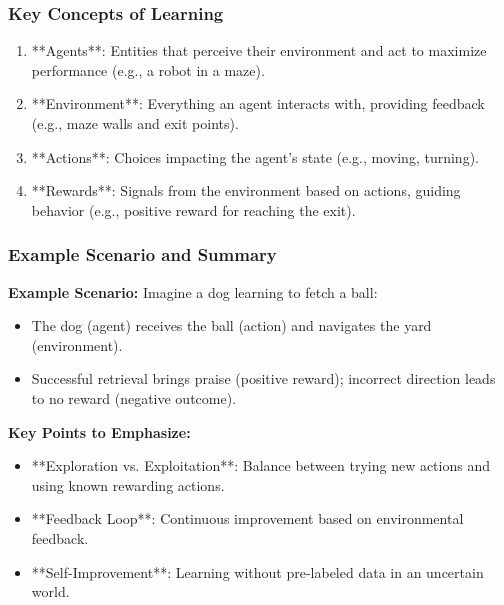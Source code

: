 \documentclass[aspectratio=169]{beamer}
\begin{document}
\begin{frame}[fragile]
    \frametitle{Key Concepts of Learning}
    \begin{enumerate}
        \item **Agents**: Entities that perceive their environment and act to maximize performance (e.g., a robot in a maze).
        \item **Environment**: Everything an agent interacts with, providing feedback (e.g., maze walls and exit points).
        \item **Actions**: Choices impacting the agent's state (e.g., moving, turning).
        \item **Rewards**: Signals from the environment based on actions, guiding behavior (e.g., positive reward for reaching the exit).
    \end{enumerate}
\end{frame}

\begin{frame}[fragile]
    \frametitle{Example Scenario and Summary}
    \textbf{Example Scenario:}
    Imagine a dog learning to fetch a ball:
    \begin{itemize}
        \item The dog (agent) receives the ball (action) and navigates the yard (environment).
        \item Successful retrieval brings praise (positive reward); incorrect direction leads to no reward (negative outcome).
    \end{itemize}

    \textbf{Key Points to Emphasize:}
    \begin{itemize}
        \item **Exploration vs. Exploitation**: Balance between trying new actions and using known rewarding actions.
        \item **Feedback Loop**: Continuous improvement based on environmental feedback.
        \item **Self-Improvement**: Learning without pre-labeled data in an uncertain world.
    \end{itemize}
\end{frame}
\end{document}
